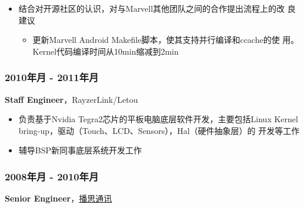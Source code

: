 \documentclass[11pt,dvipdfmx,CJKbookmarks]{article}
\begin{document}
\begin{CJK*}{UTF8}{simsun}
\begin{itemize}
\begin{itemize}
\item 在\thinspace Uboot\thinspace 里参考原有的\thinspace usbtty\thinspace 代码（for old CPU and USB framework），
从头重新\thinspace bring up\thinspace 了\thinspace usbtty\thinspace 以解决\thinspace Form Factor\thinspace 上串口调试不便的问题
\item 实现在\thinspace Linux\thinspace 下用\thinspace fastboot\thinspace 对\thinspace Marvell\thinspace 方案的整机烧写，解决了工程师只
能在\thinspace Windows\thinspace 机器上用\thinspace Marvell\thinspace 私有工具做整机烧写的问题，提升同事的
开发效率
\end{itemize}

\item 结合对开源社区的认识，对与\thinspace Marvell\thinspace 其他团队之间的合作提出流程上的改
良建议

\begin{itemize}
\item 更新\thinspace Marvell Android Makefile\thinspace 脚本，使其支持并行编译和\thinspace ccache\thinspace 的使
用。Kernel\thinspace 代码编译时间从\thinspace 10min\thinspace 缩减到\thinspace 2min
\end{itemize}
\end{itemize}

\subsubsection{2010\thinspace 年\thinspace 月 - 2011\thinspace 年\thinspace 月}
\label{sec-1-0-4}

\textbf{Staff Engineer}，RayzerLink/Letou

\begin{itemize}
\item 负责基于\thinspace Nvidia Tegra2\thinspace 芯片的平板电脑底层软件开发，主要包括\thinspace Linux
Kernel bring-up，驱动（Touch、LCD、Sensors），Hal（硬件抽象层）的
开发等工作

\item 辅导\thinspace BSP\thinspace 新同事底层系统开发工作
\end{itemize}

\subsubsection{2008\thinspace 年\thinspace 月 - 2010\thinspace 年\thinspace 月}
\label{sec-1-0-5}

\textbf{Senior Engineer}，\href{http://www.borqs.com}{播思通讯}


\end{CJK*}
\end{document}
